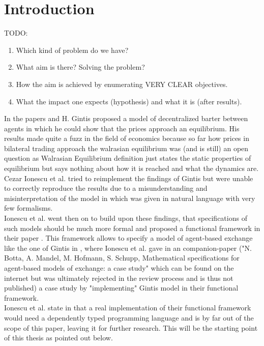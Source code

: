 \documentclass{article}
\begin{document}


\section{Introduction}

TODO:
\begin{enumerate}
\item Which kind of problem do we have?
\item What aim is there? Solving the problem? 
\item How the aim is achieved by enumerating VERY CLEAR objectives.
\item What the impact one expects (hypothesis) and what it is (after results).
\end{enumerate}

In the papers \cite{Gintis2006} and \cite{gintis_dynamics_2007} H. Gintis proposed a model of decentralized barter between agents in which he could show that the prices approach an equilibrium. His results made quite a fuzz in the field of economics because so far how prices in bilateral trading approach the walrasian equilibrium was (and is still) an open question as Walrasian Equilibrium definition just states the static properties of equilibrium but says nothing about how it is reached and what the dynamics are. \\
Cezar Ionescu et al. tried to reimplement the findings of Gintis but were unable to correctly reproduce the results due to a misunderstanding and misinterpretation of the model in \cite{Gintis2006} which was given in natural language with very few formalisms. \\
Ionescu et al. went then on to build upon these findings, that specifications of such models should be much more formal and proposed a functional framework in their paper \cite{Botta20114025}. This framework allows to specify a model of agent-based exchange like the one of Gintis in \cite{Gintis2006}, where Ionescu et al. gave in an companion-paper ("N. Botta, A. Mandel, M. Hofmann, S. Schupp, Mathematical specifications for agent-based models of exchange: a case study" which can be found on the internet but was ultimately rejected in the review process and is thus not published) a case study by "implementing" Gintis model in their functional framework. \\
Ionescu et al. state in \cite{Botta20114025} that a real implementation of their functional framework would need a dependently typed programming language and is by far out of the scope of this paper, leaving it for further research. This will be the starting point of this thesis as pointed out below.\\
\end{document}
